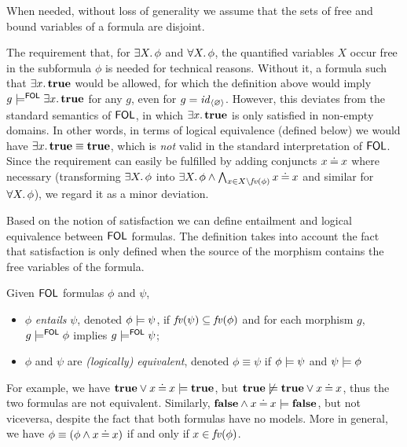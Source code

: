 %
When needed, without loss of generality we assume that the sets of free and bound variables of a formula are disjoint.  

The requirement that, for $\exists X.\,\phi$ and $\forall X.\,\phi$, the quantified variables $X$ occur free in the subformula $\phi$ is needed for technical reasons. Without it, a formula such that $\exists x.\,\textbf{true}$ would be allowed, for which the definition above would imply $g\models^{\mathsf{FOL}} \exists x.\,\textbf{true}$ for any $g$, even for $g=\mathit{id}_{\langle{\varnothing}\rangle}$. However, this deviates from the standard semantics of $\mathsf{FOL}$, in which $\exists x.\,\textbf{true}$ is only satisfied in non-empty domains. In other words, in terms of logical equivalence (defined below) we would have $\exists x.\,\textbf{true} \equiv \textbf{true}$, which is \emph{not} valid in the standard interpretation of $\mathsf{FOL}$. Since the requirement can easily be fulfilled by adding conjuncts $x\mathbin{\doteq} x$ where necessary (transforming $\exists X.\,\phi$ into $\exists X.\, \phi\wedge \bigwedge_{x\in X\setminus \mathit{fv}(\phi)} x\mathbin{\doteq} x$ and similar for $\forall X.\, \phi$), we regard it as a minor deviation.

\medskip\noindent Based on the notion of satisfaction we can define entailment and logical equivalence between $\mathsf{FOL}$ formulas. The definition takes into account the fact that satisfaction is only defined when the source of the morphism contains the free variables of the formula.

\begin{definition}
  \label{def:entailsFOL}
  Given $\mathsf{FOL}$ formulas $\phi$ and $\psi$, 
  \begin{itemize} 
    \item $\phi$  \emph{entails} $\psi$, denoted $\phi \models \psi$, if $\mathit{fv}(\psi) \subseteq \mathit{fv}(\phi)$ and for each morphism $g$, $g \models^{\mathsf{FOL}} \phi$ implies  $g \models^{\mathsf{FOL}} \psi$;
    \item $\phi$ and $\psi$ are \emph{(logically) equivalent}, denoted $\phi \equiv \psi$ if $\phi \models \psi$ and $\psi \models \phi$
  \end{itemize}
\end{definition}

For example, we have $\textbf{true} \lor x\mathbin{\doteq} x \models \textbf{true}$, but $\textbf{true} \not \models \textbf{true} \lor x\mathbin{\doteq} x$, thus the two formulas are not equivalent. Similarly, $\textbf{false} \land x\mathbin{\doteq} x \models \textbf{false}$, but not viceversa, despite the fact that both formulas have no models. More in general, we have $\phi \equiv (\phi \wedge x \mathbin{\doteq} x)$ if and only if $x \in \mathit{fv}(\phi)$.


